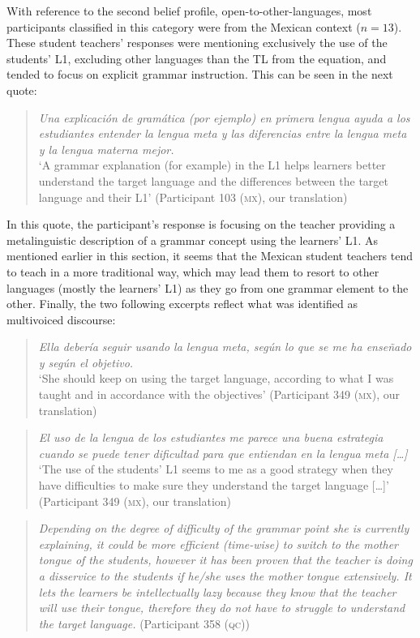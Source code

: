 \documentclass[output=paper]{../langscibook}
\begin{document}
With reference to the second belief profile, open-to-other-languages, most participants classified in this category were from the Mexican context ($n=13$). These student teachers’ responses were mentioning exclusively the use of the students’ L1, excluding other languages than the TL from the equation, and tended to focus on explicit grammar instruction. This can be seen in the next quote:

\begin{quote}
\emph{Una explicación de gramática (por ejemplo) en primera lengua ayuda a los estudiantes entender la lengua meta y las diferencias entre la lengua meta y la lengua materna mejor.}\smallskip\\
`A grammar explanation (for example) in the L1 helps learners better understand the target language and the differences between the target language and their L1' (Participant 103 (\textsc{mx}), our translation)
\end{quote}

In this quote, the participant’s response is focusing on the teacher providing a metalinguistic description of a grammar concept using the learners’ L1. As mentioned earlier in this section, it seems that the Mexican student teachers tend to teach in a more traditional way, which may lead them to resort to other languages (mostly the learners’ L1) as they go from one grammar element to the other. Finally, the two following excerpts reflect what was identified as multivoiced discourse:

\begin{quote}
\emph{Ella debería seguir usando la lengua meta, según lo que se me ha enseñado y según el objetivo.}\smallskip\\
`She should keep on using the target language, according to what I was taught and in accordance with the objectives' (Participant 349 (\textsc{mx}), our translation)
\end{quote}

\begin{quote}
\emph{El uso de la lengua de los estudiantes me parece una buena estrategia cuando se puede tener dificultad para que entiendan en la lengua meta […]}\smallskip\\
`The use of the students’ L1 seems to me as a good strategy when they have difficulties to make sure they understand the target language […]' (Participant 349 (\textsc{mx}), our translation)
\end{quote}

\begin{quote}
\emph{Depending on the degree of difficulty of the grammar point she is currently explaining, it could be more efficient (time-wise) to switch to the mother tongue of the students, however it has been proven that the teacher is doing a disservice to the students if he/she uses the mother tongue extensively. It lets the learners be intellectually lazy because they know that the teacher will use their tongue, therefore they do not have to struggle to understand the target language.} (Participant 358 (\textsc{qc}))
\end{quote}
\end{document}
